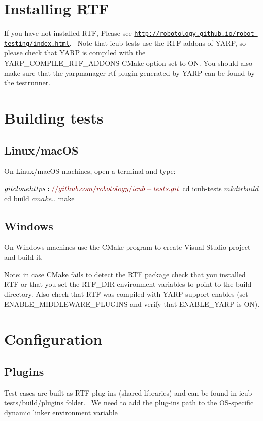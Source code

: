 \hypertarget{installation_installing_rtf}{}\section{Installing R\+TF}\label{installation_installing_rtf}
If you have not installed R\+TF, Please see \href{http://robotology.github.io/robot-testing/index.html}{\tt http\+://robotology.\+github.\+io/robot-\/testing/index.\+html}.~\newline
Note that {\ttfamily icub-\/tests} use the R\+TF addons of Y\+A\+RP, so please check that Y\+A\+RP is compiled with the {\ttfamily Y\+A\+R\+P\+\_\+\+C\+O\+M\+P\+I\+L\+E\+\_\+\+R\+T\+F\+\_\+\+A\+D\+D\+O\+NS} C\+Make option set to ON. You should also make sure that the {\ttfamily yarpmanager} rtf-\/plugin generated by Y\+A\+RP can be found by the {\ttfamily testrunner}.~\newline
\hypertarget{installation_building_tests}{}\section{Building tests}\label{installation_building_tests}
\hypertarget{installation_building_tests_unix}{}\subsection{Linux/mac\+OS}\label{installation_building_tests_unix}
On Linux/mac\+OS machines, open a terminal and type\+: 
\begin{DoxyCode}
$ git clone https:\textcolor{comment}{//github.com/robotology/icub-tests.git}
$ cd icub-tests
$ mkdir build
$ cd build
$ cmake ..
$ make
\end{DoxyCode}
\hypertarget{installation_building_tests_win}{}\subsection{Windows}\label{installation_building_tests_win}
On Windows machines use the C\+Make program to create Visual Studio project and build it.

Note\+: in case C\+Make fails to detect the R\+TF package check that you installed R\+TF or that you set the R\+T\+F\+\_\+\+D\+IR environment variables to point to the build directory. Also check that R\+TF was compiled with Y\+A\+RP support enables (set {\ttfamily E\+N\+A\+B\+L\+E\+\_\+\+M\+I\+D\+D\+L\+E\+W\+A\+R\+E\+\_\+\+P\+L\+U\+G\+I\+NS} and verify that {\ttfamily E\+N\+A\+B\+L\+E\+\_\+\+Y\+A\+RP} is ON).\hypertarget{installation_configuration}{}\section{Configuration}\label{installation_configuration}
\hypertarget{installation_plugins}{}\subsection{Plugins}\label{installation_plugins}
Test cases are built as R\+TF plug-\/ins (shared libraries) and can be found in {\ttfamily icub-\/tests/build/plugins} folder.~\newline
We need to add the plug-\/ins path to the O\+S-\/specific dynamic linker environment variable

